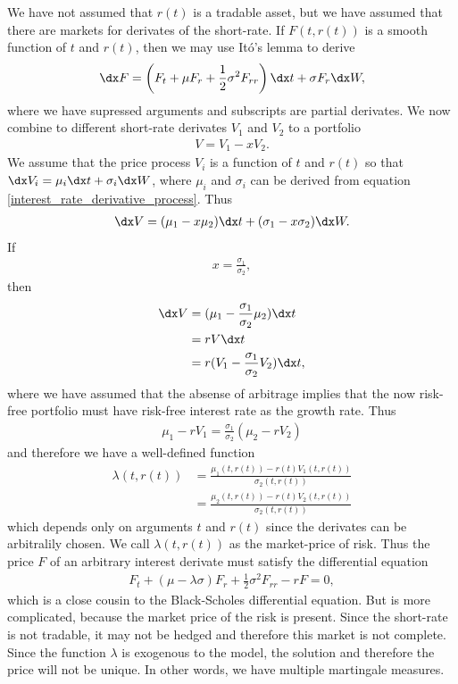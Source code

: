 We have not assumed that $r(t)$ is a tradable asset, but we have assumed that there are markets for derivates of the short-rate. If $F(t,r(t))$ is a smooth function of $t$ and $r(t)$, then we may use It\'{o}'s lemma to derive
  \begin{align}
    \label{interest_rate_derivative_process}
    \dx F = \left( F_t + \mu F_r + \frac{1}{2} \sigma^2 F_{rr} \right) \dx t + \sigma F_r \dx W ,
  \end{align}
where we have supressed arguments and subscripts are partial derivates. We now combine to different short-rate derivates $V_1$ and $V_2$ to a portfolio
  \begin{align}
    V = V_1 - x V_2.
  \end{align}
We assume that the price process $V_i$ is a function of $t$ and $r(t)$ so that $\dx V_i = \mu_i \dx t + \sigma_i \dx W$, where $\mu_i$ and $\sigma_i$ can be derived from equation \ref{interest_rate_derivative_process}. Thus
  \begin{align}
    \dx V = (\mu_1 - x \mu_2) \dx t + (\sigma_1 - x \sigma_2) \dx W .
  \end{align}
If
  \begin{align}
    x = \frac{\sigma_1}{\sigma_2} ,
  \end{align}
then 
  \begin{align}
    \dx V &= (\mu_1 - \frac{\sigma_1}{\sigma_2} \mu_2) \dx t \\
      &= r V \dx t \\
      &= r ( V_1 - \frac{\sigma_1}{\sigma_2} V_2 ) \dx t,
  \end{align}
where we have assumed that the absense of arbitrage implies that the now risk-free portfolio must have risk-free interest rate as the growth rate. Thus
  \begin{align}
    \mu_1 - rV_1 = \frac{\sigma_1}{\sigma_2} ( \mu_2 - rV_2 ) 
  \end{align}
and therefore we have a well-defined function
  \begin{align}
    \lambda(t,r(t)) &= \frac{\mu_1(t,r(t)) - r(t)V_1(t,r(t))}{\sigma_2(t,r(t))} \\ &= \frac{\mu_2(t,r(t)) - r(t)V_2(t,r(t))}{\sigma_2(t,r(t))}
  \end{align}
which depends only on arguments $t$ and $r(t)$ since the derivates can be arbitralily chosen. We call $\lambda(t,r(t))$ as the market-price of risk. Thus the price $F$ of an arbitrary interest derivate must satisfy the differential equation
  \begin{align}
     F_t + ( \mu - \lambda \sigma ) F_r + \frac{1}{2} \sigma^2 F_{rr} - r F = 0 ,
  \end{align}
which is a close cousin to the Black-Scholes differential equation. But is more complicated, because the market price of the risk is present. Since the short-rate is not tradable, it may not be hedged and therefore this market is not complete. Since the function $\lambda$ is exogenous to the model, the solution and therefore the price will not be unique. In other words, we have multiple martingale measures.


